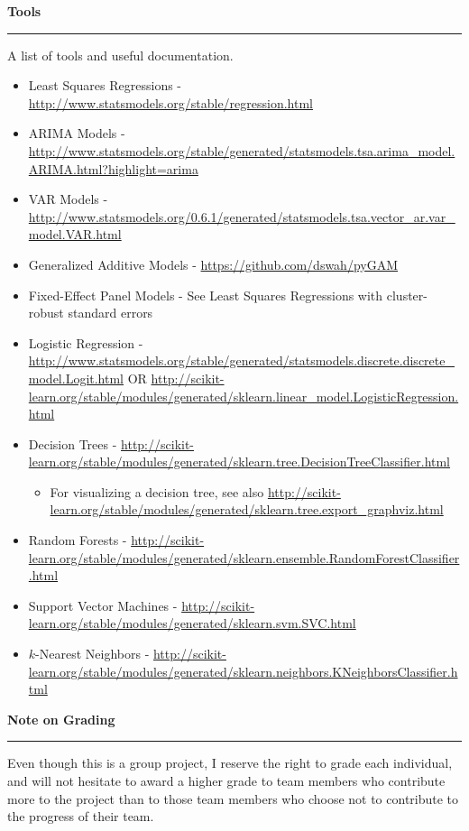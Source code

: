 \documentclass{article}
\begin{document}
\vspace*{2em}
\noindent \Large \textbf{Tools}\\[-.8em]\hrule \vspace*{.5em}
\large \noindent A list of tools and useful documentation.\vspace*{.5em}

\begin{itemize}

\item Least Squares Regressions - \url{http://www.statsmodels.org/stable/regression.html}
\item ARIMA Models - \url{http://www.statsmodels.org/stable/generated/statsmodels.tsa.arima_model.ARIMA.html?highlight=arima}
\item VAR Models - \url{http://www.statsmodels.org/0.6.1/generated/statsmodels.tsa.vector_ar.var_model.VAR.html}
\item Generalized Additive Models - \url{https://github.com/dswah/pyGAM}
\item Fixed-Effect Panel Models - See Least Squares Regressions with cluster-robust standard errors
\item Logistic Regression - \url{http://www.statsmodels.org/stable/generated/statsmodels.discrete.discrete_model.Logit.html} OR \url{http://scikit-learn.org/stable/modules/generated/sklearn.linear_model.LogisticRegression.html}
\item Decision Trees - \url{http://scikit-learn.org/stable/modules/generated/sklearn.tree.DecisionTreeClassifier.html}
\begin{itemize}
\item For visualizing a decision tree, see also \url{http://scikit-learn.org/stable/modules/generated/sklearn.tree.export_graphviz.html}
\end{itemize}
\item Random Forests - \url{http://scikit-learn.org/stable/modules/generated/sklearn.ensemble.RandomForestClassifier.html}
\item Support Vector Machines - \url{http://scikit-learn.org/stable/modules/generated/sklearn.svm.SVC.html}
\item $k$-Nearest Neighbors - \url{http://scikit-learn.org/stable/modules/generated/sklearn.neighbors.KNeighborsClassifier.html}

\end{itemize}

\vspace*{2em}
\noindent \Large \textbf{Note on Grading}\\[-.8em]\hrule \vspace*{.5em}
\large \noindent Even though this is a group project, I reserve the right to grade each individual, and will not hesitate to award a higher grade to team members who contribute more to the project than to those team members who choose not to contribute to the progress of their team.\vspace*{.5em}
\end{document}

